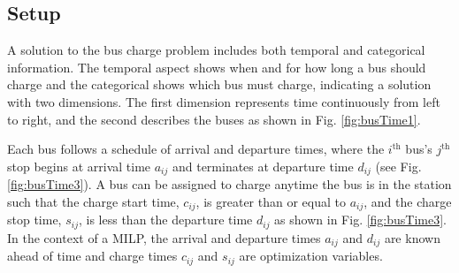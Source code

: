 \subsection{Setup}
\par A solution to the bus charge problem includes both temporal and categorical information. The temporal aspect shows when and for how long a bus should charge and the categorical shows which bus must charge, indicating a solution with two dimensions.  The first dimension represents time continuously from left to right, and the second describes the buses as shown in Fig. \ref{fig:busTime1}.

\par Each bus follows a schedule of arrival and departure times, where the $i^{\text{th}}$ bus's $j^{\text{th}}$ stop begins at arrival time $a_{ij}$ and terminates at departure time $d_{ij}$ (see Fig. \ref{fig:busTime3}).  A bus can be assigned to charge anytime the bus is in the station such that the charge start time, $c_{ij}$, is greater than or equal to $a_{ij}$, and the charge stop time, $s_{ij}$, is less than the departure time $d_{ij}$ as shown in Fig. \ref{fig:busTime3}. In the context of a MILP, the arrival and departure times $a_{ij}$ and $d_{ij}$ are known ahead of time and charge times $c_{ij}$ and $s_{ij}$ are optimization variables. 

